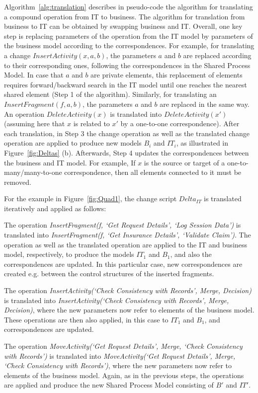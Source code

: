 Algorithm~\ref{alg:translation} describes in pseudo-code the algorithm for translating a compound operation from IT to business. The algorithm for translation from business to IT can be obtained by swapping business and IT. Overall, one key step is replacing parameters of the operation from the IT model by parameters of the business model according to the correspondences. For example, for translating a change $InsertActivity(x,a,b)$, the parameters $a$ and $b$ are replaced according to their corresponding ones, following the correspondences in the Shared Process Model. In case that $a$ and $b$ are private elements, this replacement of elements requires forward/backward search in the IT model until one reaches the nearest shared element (Step 1 of the algorithm). Similarly, for translating an $InsertFragment(f,a,b)$, the parameters $a$ and $b$ are replaced in the same way. An operation $DeleteActivity(x)$ is translated into $DeleteActivity(x')$ (assuming here that $x$ is related to $x'$ by a one-to-one correspondence). After each translation, in Step 3 the change operation as well as the translated change operation are applied to produce new models $B_i$ and $IT_i$, as illustrated in Figure~\ref{fig:Deltas} (b). Afterwards, Step 4 updates the correspondences between the business and IT model. For example, If $x$ is the source or target of a one-to-many/many-to-one correspondence, then all elements connected to it must be removed.

For the example in Figure~\ref{fig:Quad1}, the change script $Delta_{IT}$ is translated iteratively and applied as follows:

{\small
\begin{itemize*}

\item The operation \emph{InsertFragment(f, `Get Request Details', `Log Session Data')} is translated into \emph{InsertFragment(f, `Get Insurance Details', `Validate Claim')}.
The operation as well as the translated operation are applied to the IT and business model, respectively, to produce the models $IT_1$ and $B_1$, and also the correspondences are updated. In this particular case, new correspondences are created e.g. between the control structures of the inserted fragments.

\item The operation \emph{InsertActivity(`Check Consistency with Records', Merge, Decision)} is translated into \emph{InsertActivity(`Check Consistency with Records', Merge, Decision)}, where the new parameters now refer to elements of the business model. These operations are then also applied, in this case to $IT_1$ and $B_1$, and correspondences are updated.

\item The operation \emph{MoveActivity(`Get Request Details', Merge, `Check Consistency with Records')} is translated into \emph{MoveActivity(`Get Request Details', Merge, `Check Consistency with Records')}, where the new parameters now refer to elements of the business model. Again, as in the previous steps, the operations are applied and produce the new Shared Process Model consisting of $B'$ and $IT'$.

\end{itemize*}
}

